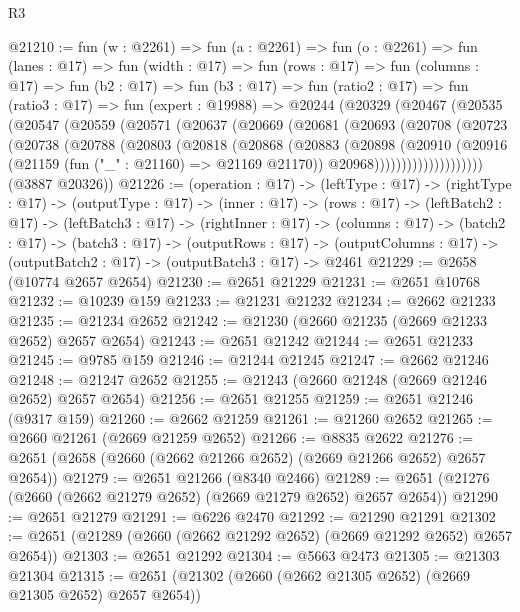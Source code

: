 \begin{lexlean}{R3}
\begin{coremodule}
@21210 := fun (w : @2261) =>
  fun (a : @2261) =>
  fun (o : @2261) =>
  fun (lanes : @17) =>
  fun (width : @17) =>
  fun (rows : @17) =>
  fun (columns : @17) =>
  fun (b2 : @17) =>
  fun (b3 : @17) =>
  fun (ratio2 : @17) =>
  fun (ratio3 : @17) =>
  fun (expert : @19988) =>
  @20244
    (@20329
      (@20467
        (@20535
          (@20547
            (@20559
              (@20571
                (@20637
                  (@20669
                    (@20681
                      (@20693
                        (@20708
                          (@20723
                            (@20738
                              (@20788
                                (@20803
                                  (@20818
                                    (@20868
                                      (@20883
                                        (@20898
                                          (@20910
                                            (@20916
                                              (@21159 (fun ("_" : @21160) => @21169 @21170))
                                              @20968))))))))))))))))))))
      (@3887 @20326))
@21226 := (operation : @17) ->
  (leftType : @17) ->
  (rightType : @17) ->
  (outputType : @17) ->
  (inner : @17) ->
  (rows : @17) ->
  (leftBatch2 : @17) ->
  (leftBatch3 : @17) ->
  (rightInner : @17) ->
  (columns : @17) ->
  (batch2 : @17) ->
  (batch3 : @17) ->
  (outputRows : @17) ->
  (outputColumns : @17) -> (outputBatch2 : @17) -> (outputBatch3 : @17) -> @2461
@21229 := @2658 (@10774 @2657 @2654)
@21230 := @2651 @21229
@21231 := @2651 @10768
@21232 := @10239 @159
@21233 := @21231 @21232
@21234 := @2662 @21233
@21235 := @21234 @2652
@21242 := @21230 (@2660 @21235 (@2669 @21233 @2652) @2657 @2654)
@21243 := @2651 @21242
@21244 := @2651 @21233
@21245 := @9785 @159
@21246 := @21244 @21245
@21247 := @2662 @21246
@21248 := @21247 @2652
@21255 := @21243 (@2660 @21248 (@2669 @21246 @2652) @2657 @2654)
@21256 := @2651 @21255
@21259 := @2651 @21246 (@9317 @159)
@21260 := @2662 @21259
@21261 := @21260 @2652
@21265 := @2660 @21261 (@2669 @21259 @2652)
@21266 := @8835 @2622
@21276 := @2651 (@2658 (@2660 (@2662 @21266 @2652) (@2669 @21266 @2652) @2657 @2654))
@21279 := @2651 @21266 (@8340 @2466)
@21289 := @2651 (@21276 (@2660 (@2662 @21279 @2652) (@2669 @21279 @2652) @2657 @2654))
@21290 := @2651 @21279
@21291 := @6226 @2470
@21292 := @21290 @21291
@21302 := @2651 (@21289 (@2660 (@2662 @21292 @2652) (@2669 @21292 @2652) @2657 @2654))
@21303 := @2651 @21292
@21304 := @5663 @2473
@21305 := @21303 @21304
@21315 := @2651 (@21302 (@2660 (@2662 @21305 @2652) (@2669 @21305 @2652) @2657 @2654))

\end{coremodule}
\end{lexlean}
